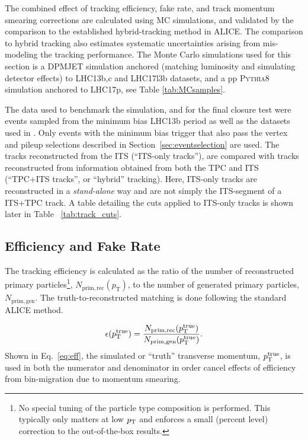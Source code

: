 The combined effect of tracking efficiency, fake rate, and track momentum smearing corrections are calculated using MC simulations, and validated by the comparison to the established hybrid-tracking method in ALICE. The comparison to hybrid tracking also estimates systematic uncertainties arising  from mis-modeling the tracking performance. The Monte Carlo simulations used for this section is a \textsc{DPMJET} simulation anchored (matching luminosity and simulating detector effects) to LHC13b,c and LHC17l3b datasets, and a pp \textsc{Pythia8} simulation anchored to LHC17p, see Table \ref{tab:MCsamples}. 

The data used to benchmark the simulation, and for the final closure test were events sampled from the minimum bias LHC13b period as well as the datasets used in \cite{Acharya:2018qsh}. Only events with the minimum bias trigger that also pass the vertex and pileup selections described in Section~\ref{sec:eventselection} are used. The tracks reconstructed from the ITS (``ITS-only tracks''), are compared with tracks reconstructed from information obtained from both the TPC and ITS (``TPC+ITS tracks'', or ``hybrid'' tracking). Here, ITS-only tracks are reconstructed in a \textit{stand-alone} way and are not simply the ITS-segment of a ITS+TPC track. A table detailing the cuts applied to ITS-only tracks is shown later in Table ~\ref{tab:track_cuts}.


\subsection{Efficiency and Fake Rate}
\label{sec:Efficiency_fake_rates}
The tracking efficiency is calculated as the ratio of the number of reconstructed primary particles\footnote{No special tuning of the particle type composition is performed. This typically only matters at low $p_{\mathrm{T}}$ and enforces a small (percent level) correction to the out-of-the-box results.}, $N_{\mathrm{prim,rec}}(p_\mathrm{T})$, to the number of generated primary particles, $N_{\mathrm{prim,gen}}$. The truth-to-reconstructed matching is done following the standard ALICE method.

\begin{equation}\label{eq:eff}
\epsilon (p_{\mathrm{T}}^{\mathrm{true}}) = \frac{N_{\mathrm{prim,rec}}(p_{\mathrm{T}}^{\mathrm{true}})}{N_{\mathrm{prim,gen}}(p_{\mathrm{T}}^{\mathrm{true}})}.
\end{equation}
Shown in Eq.~\ref{eq:eff}, the simulated or ``truth'' transverse momentum, $p_{\mathrm{T}}^{\mathrm{true}}$, is used in both the numerator and denominator in order cancel effects of efficiency from bin-migration due to momentum smearing.


